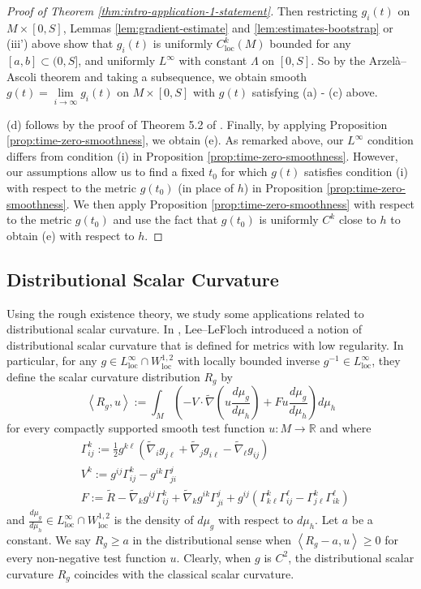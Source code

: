 \documentclass[12pt]{amsart}
\theoremstyle{plain}
\theoremstyle{plain}
\theoremstyle{definition}
\theoremstyle{remark}
\numberwithin{equation}{subsection}
\newcommand{\hdel}{\tilde{\nabla}}
\begin{document}
\begin{proof}[Proof of Theorem \ref{thm:intro-application-1-statement}]
    Then restricting $g_i(t)$ on $M \times [0,S]$, Lemmas \ref{lem:gradient-estimate} and \ref{lem:estimates-bootstrap} or (iii') above show that $g_i(t)$ is uniformly $C_\text{loc}^k(M)$ bounded for any $[a,b] \subset (0, S]$, and uniformly $L^\infty$ with constant $\Lambda$ on $[0,S]$. So by the Arzel\`a--Ascoli theorem and taking a subsequence, we obtain smooth $g(t) = \lim\limits_{i\to\infty}g_i(t)$ on $M \times [0,S]$ with $g(t)$ satisfying (a) - (c) above.

    (d) follows by the proof of Theorem 5.2 of \cite{simon_deformation_2002}. Finally, by applying Proposition \ref{prop:time-zero-smoothness}, we obtain (e). As remarked above, our $L^\infty$ condition differs from condition (i) in Proposition \ref{prop:time-zero-smoothness}. However, our assumptions allow us to find a fixed $t_0$ for which $g(t)$ satisfies condition (i) with respect to the metric $g(t_0)$ (in place of $h$) in Proposition \ref{prop:time-zero-smoothness}. We then apply Proposition \ref{prop:time-zero-smoothness} with respect to the metric $g(t_0)$ and use the fact that $g(t_0)$ is uniformly $C^k$ close to $h$ to obtain (e) with respect to $h$.
\end{proof}

\subsection{Distributional Scalar Curvature}

Using the rough existence theory, we study some applications related to distributional scalar curvature. In \cite{lee_positive_2015}, Lee--LeFloch introduced a notion of distributional scalar curvature that is defined for metrics with low regularity. In particular, for any $g \in L^\infty_{\text{loc}}\cap W^{1,2}_{\text{loc}}$ with locally bounded inverse $g^{-1}\in L^\infty_{\text{loc}}$, they define the scalar curvature distribution $R_g$ by
\begin{equation}\label{eqn:distributional-scalar-defn}
    \left\langle R_g, u\right\rangle := \int_M \left(-V\cdot\hdel\left(u\frac{d\mu_g}{d\mu_h}\right)+Fu\frac{d\mu_g}{d\mu_h}\right)d\mu_h
\end{equation}
for every compactly supported smooth test function $u:M\to\mathbb{R}$ and where
\begin{align*}
    &\Gamma^k_{ij} := \frac{1}{2}g^{k\ell}\left(\hdel_ig_{j\ell}+\hdel_jg_{i\ell}-\hdel_{\ell}g_{ij}\right) \\
    &V^k := g^{ij}\Gamma^{k}_{ij} - g^{ik}\Gamma^{j}_{ji} \\
    &F := \tilde{R} - \hdel_kg^{ij}\Gamma^k_{ij} + \hdel_kg^{ik}\Gamma^{j}_{ji} + g^{ij}\left(\Gamma^{k}_{k\ell}\Gamma^{\ell}_{ij} - \Gamma^{k}_{j\ell}\Gamma^{\ell}_{ik}\right)
\end{align*}
and $\frac{d\mu_g}{d\mu_h}\in L^\infty_{\text{loc}}\cap W^{1,2}_{\text{loc}}$ is the density of $d\mu_g$ with respect to $d\mu_h$. Let $a$ be a constant. We say $R_g \geq a$ in the distributional sense when $\left\langle R_g - a, u\right\rangle \geq 0$ for every non-negative test function $u$. Clearly, when $g$ is $C^2$, the distributional scalar curvature $R_g$ coincides with the classical scalar curvature.
\end{document}

